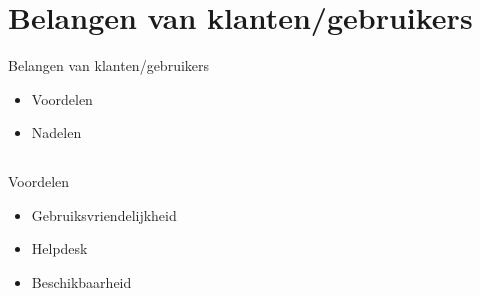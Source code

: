 \documentclass{beamer}
\begin{document}

    

\section[Klant]{Belangen van klanten/gebruikers}
\begin{frame}{Belangen van klanten/gebruikers}
    \begin{itemize}
            \item Voordelen 
            \item Nadelen
    \end{itemize} 
\end{frame}
    \subsection{}
    \begin{frame}{Voordelen}
        \begin{itemize}
            \item Gebruiksvriendelijkheid
            \item Helpdesk
            \item Beschikbaarheid
        \end{itemize}
    \end{frame}
            
\end{document}
